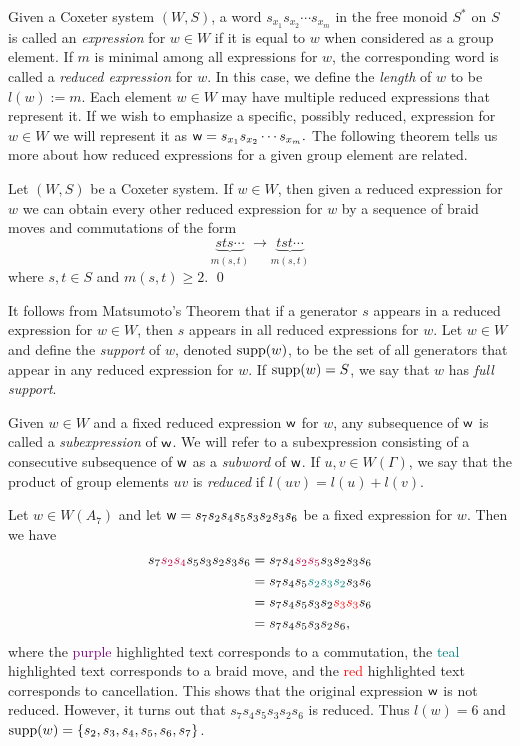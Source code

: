 Given a Coxeter system $(W,S)$, a word $s_{x_1}s_{x_2} \cdots s_{x_m}$ in the free monoid $S^*$ on $S$ is called an \emph{expression} for $w \in W$ if it is equal to $w$ when considered as a group element. If $m$ is minimal among all expressions for $w$, the corresponding word is called a \emph{reduced expression} for $w$. In this case, we define the \emph{length} of $w$ to be $l(w):= m$. Each element $w \in W$ may have multiple reduced expressions that represent it. If we wish to emphasize a specific, possibly reduced, expression for $w \in W$ we will represent it as $\mathsf{w}=s_{x_1}s_{x_2}\cdots s_{x_m}.$ The following theorem tells us more about how reduced expressions for a given group element are related.

\begin{theorem} 
	Let $(W,S)$ be a Coxeter system. If $w \in W$, then given a reduced expression for $w$ we can obtain every other reduced expression for $w$ by a sequence of braid moves and commutations of the form
	\[\underbrace{sts\cdots}_{m(s,t)} \rightarrow \underbrace{tst\cdots}_{m(s,t)}\]
	where $s,t \in S$ and $m(s,t) \geq 2$. \qed
\end{theorem}
 
It follows from Matsumoto's Theorem that if a generator $s$ appears in a reduced expression for $w \in W$, then $s$ appears in all reduced expressions for $w$. Let $w \in W$ and define the \emph{support} of $w$, denoted $\mathrm{supp}(w)$, to be the set of all generators that appear in any reduced expression for $w$. If $\mathrm{supp}(w)=S$, we say that $w$ has \emph{full support}. 

Given $w \in W$ and a fixed reduced expression $\mathsf{w}$ for $w$, any subsequence of $\mathsf{w}$ is called a \emph{subexpression} of $\mathsf{w}$. We will refer to a subexpression consisting of a consecutive subsequence of $\mathsf{w}$ as a \emph{subword} of $\mathsf{w}$. If $u,v \in W(\Gamma)$, we say that the product of group elements $uv$ is \emph{reduced} if $l(uv)=l(u)+l(v)$. \\

\begin{example}
Let $w \in W(A_7)$ and let $\mathsf{w}=s_7s_2s_4s_5s_3s_2s_3s_6$ be a fixed expression for $w$. Then we have 
\begin{align*}
s_7\textcolor{purple}{s_2s_4}s_5s_3s_2s_3s_6&=s_7s_4\textcolor{purple}{s_2s_5}s_3s_2s_3s_6\\
&=s_7s_4s_5\textcolor{teal}{s_2s_3s_2} s_3s_6\\
&=s_7s_4s_5s_3s_2\textcolor{red}{s_3s_3}s_6\\
&=s_7s_4s_5s_3s_2s_6,
\end{align*}
where the \textcolor{purple}{purple} highlighted text corresponds to a commutation, the \textcolor{teal}{teal} highlighted text corresponds to a braid move, and the \textcolor{red}{red} highlighted text corresponds to cancellation. This shows that the original expression $\mathsf{w}$ is not reduced. However, it turns out that $s_7s_4s_5s_3s_2s_6$ is reduced. Thus $l(w)=6$ and $\mathrm{supp}(w)=\{s_2, s_3, s_4, s_5, s_6, s_7\}$.
\end{example}


